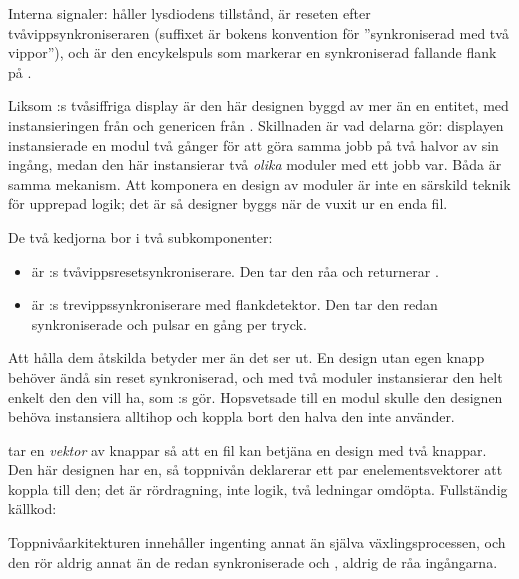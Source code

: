 Interna signaler:  håller lysdiodens tillstånd,  är reseten efter
tvåvippsynkroniseraren (suffixet  är bokens konvention för ”synkroniserad med två
vippor”), och  är den encykelspuls som markerar en synkroniserad fallande
flank på .

Liksom :s tvåsiffriga display är den här designen byggd av mer än en entitet, med
instansieringen från  och genericen från .
Skillnaden är vad delarna gör: displayen instansierade en modul två gånger för att göra samma jobb
på två halvor av sin ingång, medan den här instansierar två \emph{olika} moduler med ett jobb var.
Båda är samma mekanism. Att komponera en design av moduler är inte en särskild teknik för upprepad
logik; det är så designer byggs när de vuxit ur en enda fil.

De två kedjorna bor i två subkomponenter:
\begin{itemize}
  \item {} är :s tvåvippsresetsynkroniserare. Den tar den
    råa  och returnerar .
  \item {} är :s trevippssynkroniserare med
    flankdetektor. Den tar den redan synkroniserade  och pulsar
     en gång per tryck.
\end{itemize}

Att hålla dem åtskilda betyder mer än det ser ut. En design utan egen knapp behöver ändå sin reset
synkroniserad, och med två moduler instansierar den helt enkelt den den vill ha, som
:s  gör. Hopsvetsade till en modul skulle den designen behöva
instansiera alltihop och koppla bort den halva den inte använder.

 tar en \emph{vektor} av knappar så att en fil kan betjäna en design med två
knappar. Den här designen har en, så toppnivån deklarerar ett par enelementsvektorer att koppla
till den; det är rördragning, inte logik, två ledningar omdöpta. Fullständig källkod:


Toppnivåarkitekturen innehåller ingenting annat än själva växlingsprocessen, och den rör aldrig
annat än de redan synkroniserade  och , aldrig de råa
ingångarna.

